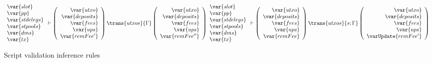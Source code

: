 \begin{figure}[htb]
\begin{equation}
{    \\
    ~
    \\
    {
    \begin{array}{l}
      \var{slot}\\
      \var{pp}\\
      \var{stdelegs}\\
      \var{stpools}\\
      \var{dms}\\
      \var{tx}\\
    \end{array}
    }
      \vdash
      \left(
      {
      \begin{array}{r}
        \var{utxo} \\
        \var{deposits} \\
        \var{fees} \\
        \var{ups} \\
        \var{remFee'}\\
      \end{array}
      }
      \right)
      \trans{utxos}{\Gamma}
      \left(
      {
      \begin{array}{r}
        \var{utxo} \\
        \var{deposits} \\
        \var{fees} \\
        \var{ups} \\
        \var{remFee''}\\
      \end{array}
      }
      \right)
    }
    {
    \begin{array}{l}
      \var{slot}\\
      \var{pp}\\
      \var{stdelegs}\\
      \var{stpools}\\
      \var{dms}\\
      \var{tx}\\
    \end{array}
      \vdash
      \left(
      \begin{array}{r}
        \var{utxo} \\
        \var{deposits} \\
        \var{fees} \\
        \var{ups} \\
        \var{remFee}\\
      \end{array}
      \right)
      \trans{utxos}{s;\Gamma}
      \left(
      \begin{array}{r}
        \var{utxo} \\
        \var{deposits} \\
        \var{fees} \\
        \var{ups} \\
        \varUpdate{remFee'}\\
      \end{array}
      \right)
    }
  \end{equation}
  \caption{Script validation inference rules}
  \label{fig:rules:utxo-scrval}
\end{figure}

